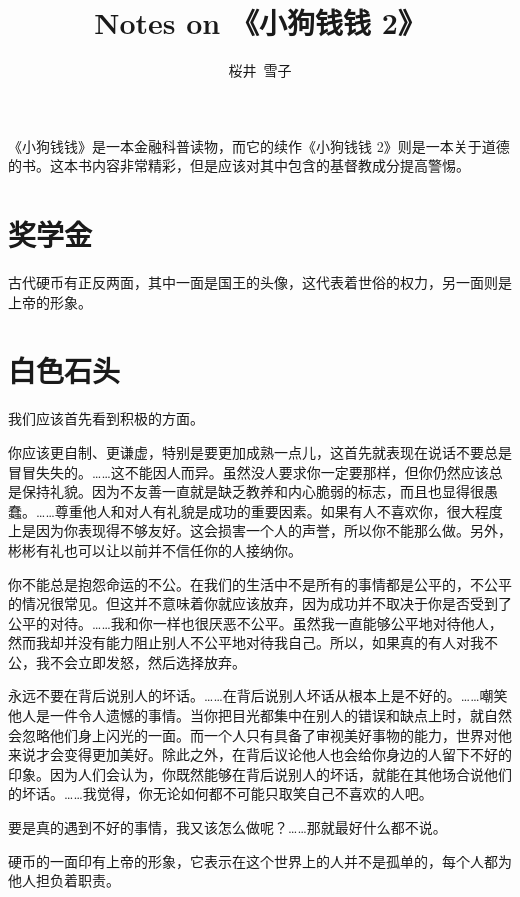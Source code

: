 \documentclass{ctexart}
\title{Notes on 《小狗钱钱 2》}
\author{桜井\ 雪子}
\date{}
\begin{document}
\maketitle
\tableofcontents

《小狗钱钱》是一本金融科普读物，而它的续作《小狗钱钱 2》则是一本关于道德的书。这本书内容非常精彩，但是应该对其中包含的基督教成分提高警惕。

\section{奖学金}

古代硬币有正反两面，其中一面是国王的头像，这代表着世俗的权力，另一面则是上帝的形象。

\section{白色石头}

我们应该首先看到积极的方面。

你应该更自制、更谦虚，特别是要更加成熟一点儿，这首先就表现在说话不要总是冒冒失失的。……这不能因人而异。虽然没人要求你一定要那样，但你仍然应该总是保持礼貌。因为不友善一直就是缺乏教养和内心脆弱的标志，而且也显得很愚蠢。……尊重他人和对人有礼貌是成功的重要因素。如果有人不喜欢你，很大程度上是因为你表现得不够友好。这会损害一个人的声誉，所以你不能那么做。另外，彬彬有礼也可以让以前并不信任你的人接纳你。

你不能总是抱怨命运的不公。在我们的生活中不是所有的事情都是公平的，不公平的情况很常见。但这并不意味着你就应该放弃，因为成功并不取决于你是否受到了公平的对待。……我和你一样也很厌恶不公平。虽然我一直能够公平地对待他人，然而我却并没有能力阻止别人不公平地对待我自己。所以，如果真的有人对我不公，我不会立即发怒，然后选择放弃。

永远不要在背后说别人的坏话。……在背后说别人坏话从根本上是不好的。……嘲笑他人是一件令人遗憾的事情。当你把目光都集中在别人的错误和缺点上时，就自然会忽略他们身上闪光的一面。而一个人只有具备了审视美好事物的能力，世界对他来说才会变得更加美好。除此之外，在背后议论他人也会给你身边的人留下不好的印象。因为人们会认为，你既然能够在背后说别人的坏话，就能在其他场合说他们的坏话。……我觉得，你无论如何都不可能只取笑自己不喜欢的人吧。

要是真的遇到不好的事情，我又该怎么做呢？……那就最好什么都不说。

硬币的一面印有上帝的形象，它表示在这个世界上的人并不是孤单的，每个人都为他人担负着职责。
\end{document}
